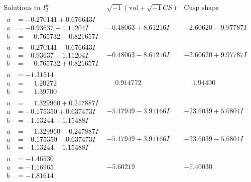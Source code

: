 \documentclass[1p]{elsarticle_modified}
\theoremstyle{definition}
\newcommand{\I}{\sqrt{-1}}
\begin{document}
$$\begin{array}{c|c|c}  
\text{Solutions to }I^u_{2}& \I (\text{vol} + \sqrt{-1}CS) & \text{Cusp shape}\\
 \hline 
\begin{aligned}
u &= -0.270141 + 0.676643 I \\
a &= -0.93637 + 1.11204 I \\
b &= \phantom{-}0.765732 - 0.821657 I\end{aligned}
 & -0.48063 + 8.61216 I & -2.60620 - 9.97787 I \\ \hline\begin{aligned}
u &= -0.270141 - 0.676643 I \\
a &= -0.93637 - 1.11204 I \\
b &= \phantom{-}0.765732 + 0.821657 I\end{aligned}
 & -0.48063 - 8.61216 I & -2.60620 + 9.97787 I \\ \hline\begin{aligned}
u &= -1.31514\phantom{ +0.000000I} \\
a &= \phantom{-}1.20272\phantom{ +0.000000I} \\
b &= \phantom{-}1.39700\phantom{ +0.000000I}\end{aligned}
 & \phantom{-}0.914772\phantom{ +0.000000I} & \phantom{-}1.94400\phantom{ +0.000000I} \\ \hline\begin{aligned}
u &= \phantom{-}1.329960 + 0.247887 I \\
a &= -0.175350 + 0.637473 I \\
b &= -1.13244 - 1.15488 I\end{aligned}
 & -5.47949 - 3.91166 I & -23.6039 + 5.6804 I \\ \hline\begin{aligned}
u &= \phantom{-}1.329960 - 0.247887 I \\
a &= -0.175350 - 0.637473 I \\
b &= -1.13244 + 1.15488 I\end{aligned}
 & -5.47949 + 3.91166 I & -23.6039 - 5.6804 I \\ \hline\begin{aligned}
u &= -1.46530\phantom{ +0.000000I} \\
a &= -1.16965\phantom{ +0.000000I} \\
b &= -1.81614\phantom{ +0.000000I}\end{aligned}
 & -5.60219\phantom{ +0.000000I} & -7.40030\phantom{ +0.000000I} \\ \hline\begin{aligned}

\end{aligned}
\end{array}$$
\end{document}
